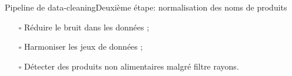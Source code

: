 \documentclass[ignorenonframetext,]{beamer}
\begin{document}
\begin{frame}{Pipeline de data-cleaning}{Deuxième étape: normalisation des noms de produits}

\begin{itemize}
    \item[\rlap{\raisebox{0.3ex}{\hspace{0.4ex}\scriptsize \ding{52}}}$\square$] Réduire le bruit dans les données ;
    \item[\rlap{\raisebox{0.3ex}{\hspace{0.4ex}\scriptsize \ding{52}}}$\square$] Harmoniser les jeux de données ;
    \item[\rlap{\raisebox{0.3ex}{\hspace{0.4ex}\scriptsize \ding{52}}}$\square$] Détecter des produits non alimentaires malgré filtre rayons.
\end{itemize}


\end{frame}
\end{document}
